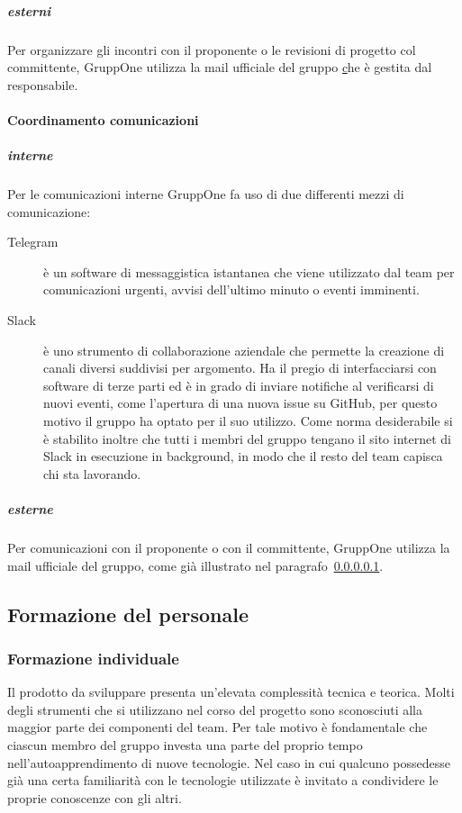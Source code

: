 \documentclass[../norme-di-progetto.tex]{subfiles}
\begin{document}
\subparagraph{esterni}%
\label{subp:coordinamento_incontri/esterni}
Per organizzare gli incontri con il proponente o le revisioni di progetto col committente, GruppOne utilizza la mail ufficiale del gruppo \href{gruppone.swe@gmail.com} che è gestita dal responsabile.

\paragraph{Coordinamento comunicazioni}%
\label{par:coordinamento_comunicazioni}

\subparagraph{interne}%
\label{subp:coordinamento_comunicazioni/interne}
Per le comunicazioni interne GruppOne fa uso di due differenti mezzi di comunicazione:
\begin{description}
  \item [Telegram] è un software di messaggistica istantanea che viene utilizzato dal team per comunicazioni urgenti, avvisi dell'ultimo minuto o eventi imminenti.
  \item [Slack] è uno strumento di collaborazione aziendale che permette la creazione di canali diversi suddivisi per argomento. Ha il pregio di interfacciarsi con software di terze parti ed è in grado di inviare notifiche al verificarsi di nuovi eventi, come l'apertura di una nuova issue su GitHub, per questo motivo il gruppo ha optato per il suo utilizzo. Come norma desiderabile si è stabilito inoltre che tutti i membri del gruppo tengano il sito internet di Slack in esecuzione in background, in modo che il resto del team capisca chi sta lavorando.
\end{description}

\subparagraph{esterne}%
\label{subp:esterne}
Per comunicazioni con il proponente o con il committente, GruppOne utilizza la mail ufficiale del gruppo, come già illustrato nel paragrafo~\ref{subp:coordinamento_incontri/esterni}.

\subsection{Formazione del personale}%
\label{sub:formazione_del_personale}

\subsubsection{Formazione individuale}%
\label{subs:formazione_individuale}

Il prodotto da sviluppare presenta un'elevata complessità tecnica e teorica.
Molti degli strumenti che si utilizzano nel corso del progetto sono sconosciuti alla maggior parte dei componenti del team.
Per tale motivo è fondamentale che ciascun membro del gruppo investa una parte del proprio tempo nell'autoapprendimento di nuove tecnologie.
Nel caso in cui qualcuno possedesse già una certa familiarità con le tecnologie utilizzate è invitato a condividere le proprie conoscenze con gli altri.
\end{document}
